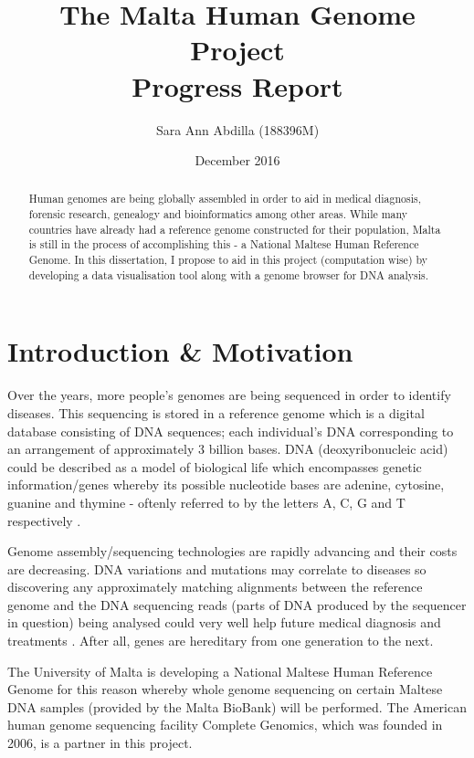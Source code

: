 \documentclass{csfyp}
\title{The Malta Human Genome Project \\
  \large Progress Report}
\author{Sara Ann Abdilla (188396M)}
\date{December 2016}
\begin{document}
\tableofcontents

\newpage

\setcounter{page}{1}


\begin{abstract}
Human genomes are being globally assembled in order to aid in medical diagnosis, forensic research, genealogy and bioinformatics among other areas.  While many countries have already had a reference genome constructed for their population, Malta is still in the process of accomplishing this - a National Maltese Human Reference Genome.  In this dissertation, I propose to aid in this project  (computation wise) by developing a data visualisation tool along with a genome browser for DNA analysis.    
\end{abstract}


\section{Introduction \& Motivation}\vspace{-2ex}
\label{s:intro}

Over the years, more people's genomes are being sequenced in order to identify diseases.  This sequencing is stored in a reference genome which is a digital database consisting of DNA sequences; each individual's DNA corresponding to an arrangement of approximately 3 billion bases.  DNA (deoxyribonucleic acid) could be described as a model of biological life which encompasses genetic information/genes whereby its possible nucleotide bases are adenine, cytosine, guanine and thymine - oftenly referred to by the letters A, C, G and T respectively \cite{aiBk, introgenom}.  

Genome assembly/sequencing technologies are rapidly advancing and their costs are decreasing.  DNA variations and mutations may correlate to diseases so discovering any approximately matching alignments between the reference genome and the DNA sequencing reads (parts of DNA produced by the sequencer in question) being analysed could very well help future medical diagnosis and treatments \cite{think}.  After all, genes are hereditary from one generation to the next.

The University of Malta is developing a National Maltese Human Reference Genome for this reason whereby whole genome sequencing on certain Maltese DNA samples (provided by the Malta BioBank) will be performed.  The American human genome sequencing facility Complete Genomics, which was founded in 2006, is a partner in this project.   
\end{document}
